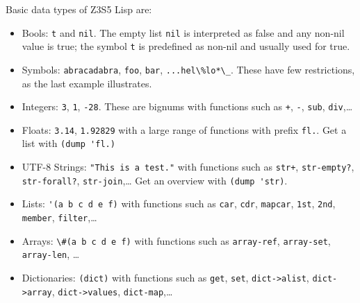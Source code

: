 \documentclass[
]{article}
\newcommand{\passthrough}[1]{#1}
\providecommand{\tightlist}{%
  \setlength{\itemsep}{0pt}\setlength{\parskip}{0pt}}
\begin{document}
Basic data types of Z3S5 Lisp are:

\begin{itemize}
\tightlist
\item
  Bools: \passthrough{\lstinline!t!} and \passthrough{\lstinline!nil!}.
  The empty list \passthrough{\lstinline!nil!} is interpreted as false
  and any non-nil value is true; the symbol \passthrough{\lstinline!t!}
  is predefined as non-nil and usually used for true.
\item
  Symbols: \passthrough{\lstinline!abracadabra!},
  \passthrough{\lstinline!foo!}, \passthrough{\lstinline!bar!},
  \passthrough{\lstinline!...hel\%lo*\_!}. These have few restrictions,
  as the last example illustrates.
\item
  Integers: \passthrough{\lstinline!3!}, \passthrough{\lstinline!1!},
  \passthrough{\lstinline!-28!}. These are bignums with functions such
  as \passthrough{\lstinline!+!}, \passthrough{\lstinline!-!},
  \passthrough{\lstinline!sub!}, \passthrough{\lstinline!div!},\ldots{}
\item
  Floats: \passthrough{\lstinline!3.14!},
  \passthrough{\lstinline!1.92829!} with a large range of functions with
  prefix \passthrough{\lstinline!fl.!}. Get a list with
  \passthrough{\lstinline!(dump 'fl.)!}
\item
  UTF-8 Strings: \passthrough{\lstinline!"This is a test."!} with
  functions such as \passthrough{\lstinline!str+!},
  \passthrough{\lstinline!str-empty?!},
  \passthrough{\lstinline!str-forall?!},
  \passthrough{\lstinline!str-join!},\ldots{} Get an overview with
  \passthrough{\lstinline!(dump 'str)!}.
\item
  Lists: \passthrough{\lstinline!'(a b c d e f)!} with functions such as
  \passthrough{\lstinline!car!}, \passthrough{\lstinline!cdr!},
  \passthrough{\lstinline!mapcar!}, \passthrough{\lstinline!1st!},
  \passthrough{\lstinline!2nd!}, \passthrough{\lstinline!member!},
  \passthrough{\lstinline!filter!},\ldots{}
\item
  Arrays: \passthrough{\lstinline!\#(a b c d e f)!} with functions such
  as \passthrough{\lstinline!array-ref!},
  \passthrough{\lstinline!array-set!},
  \passthrough{\lstinline!array-len!}, \ldots{}
\item
  Dictionaries: \passthrough{\lstinline!(dict)!} with functions such as
  \passthrough{\lstinline!get!}, \passthrough{\lstinline!set!},
  \passthrough{\lstinline!dict->alist!},
  \passthrough{\lstinline!dict->array!},
  \passthrough{\lstinline!dict->values!},
  \passthrough{\lstinline!dict-map!},\ldots{}

\end{itemize}
\end{document}
